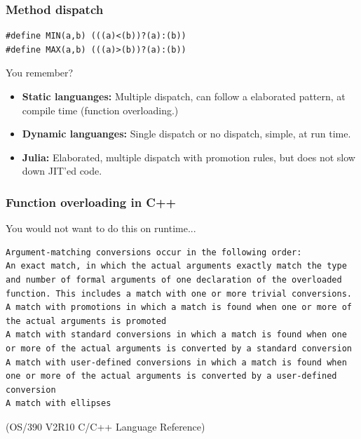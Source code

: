 \documentclass{beamer}
\begin{document}
\begin{frame}[fragile]\frametitle{Method dispatch}
 
\begin{verbatim}
#define MIN(a,b) (((a)<(b))?(a):(b))
#define MAX(a,b) (((a)>(b))?(a):(b))
\end{verbatim}
 
You remember?

\begin{itemize}
\item[] {\bf Static languanges:} Multiple dispatch, can follow a elaborated pattern, at compile time (function overloading.)
\item[] {\bf Dynamic languanges:} Single dispatch or no dispatch, simple, at run time.
\item[] {\bf Julia:} Elaborated, multiple dispatch with promotion rules, but does not slow down JIT'ed code. 
\end{itemize}
\end{frame}

\begin{frame}[fragile]\frametitle{Function overloading in C++}
 You would not want to do this on runtime...
\begin{verbatim}
Argument-matching conversions occur in the following order:
An exact match, in which the actual arguments exactly match the type and number of formal arguments of one declaration of the overloaded function. This includes a match with one or more trivial conversions.
A match with promotions in which a match is found when one or more of the actual arguments is promoted
A match with standard conversions in which a match is found when one or more of the actual arguments is converted by a standard conversion
A match with user-defined conversions in which a match is found when one or more of the actual arguments is converted by a user-defined conversion
A match with ellipses 
\end{verbatim}
 
(OS/390 V2R10 C/C++ Language Reference)
\end{frame}
\end{document}
